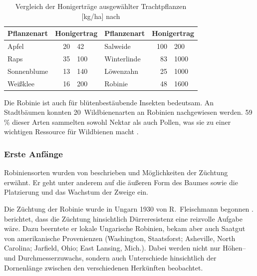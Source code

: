\documentclass[twocolumn]{scrartcl}
\begin{document}
\begin{table}[htbp]
\centering
\begin{tabular}{
    l r@{\,--\,}l 
    l r@{\,--\,}l
}
\toprule
\textbf{Pflanzenart} & \multicolumn{2}{c}{\textbf{Honigertrag}} &
\textbf{Pflanzenart} & \multicolumn{2}{c}{\textbf{Honigertrag}} \\
\midrule
Apfel         &  20 &  \hphantom{1}42    & Salweide     & 100 & \hphantom{1}200 \\
Raps          &  35 &  100    & Winterlinde  &  83 & 1000 \\
Sonnenblume   &  13 &  140    & Löwenzahn    &  25 & 1000 \\
Weißklee      &  16 &  200    & Robinie      &  48 & 1600 \\
\bottomrule
\end{tabular}
\caption{Vergleich der Honigerträge ausgewählter Trachtpflanzen [kg/ha] nach \citet{crane1951honey,crane1951honig,crane1985honig,crane1986honey}}
\label{tab:honigertraege}
\end{table}

Die Robinie ist auch für blütenbestäubende Insekten bedeutsam.  An
Stadtbäumen konnten 20~Wildbienenarten an Robinien nachgewiesen
werden.  59\,\% dieser Arten sammelten sowohl Nektar als auch Pollen,
was sie zu einer wichtigen Ressource für Wildbienen macht
\citep{hausmann2016bienen}.

\subsubsection{Erste Anfänge}

Robiniensorten wurden von \citet{vilmos1908robiniensorten} beschrieben
und Möglichkeiten der Züchtung erwähnt. Er geht unter anderem auf die
äußeren Form des Baumes sowie die Platzierung und das Wachstum der
Zweige ein.

Die Züchtung der Robinie wurde in Ungarn 1930 von R.~Fleischmann
begonnen \citep{keresztesi1983robinie}. \citet{fleischmann1933robinie}
berichtet, dass die Züchtung hinsichtlich Dürreresistenz eine
reizvolle Aufgabe wäre. Dazu beerntete er lokale Ungarische Robinien,
bekam aber auch Saatgut von amerikanische Provenienzen (Washington,
Staatsforst; Asheville, North Carolina; Jarfield, Ohio; East Lansing,
Mich.). %
Dabei werden nicht nur Höhen-- und Durchmesserzuwachs, sondern auch
Unterschiede hinsichtlich der Dornenlänge zwischen den verschiedenen
Herkünften beobachtet.
\end{document}
